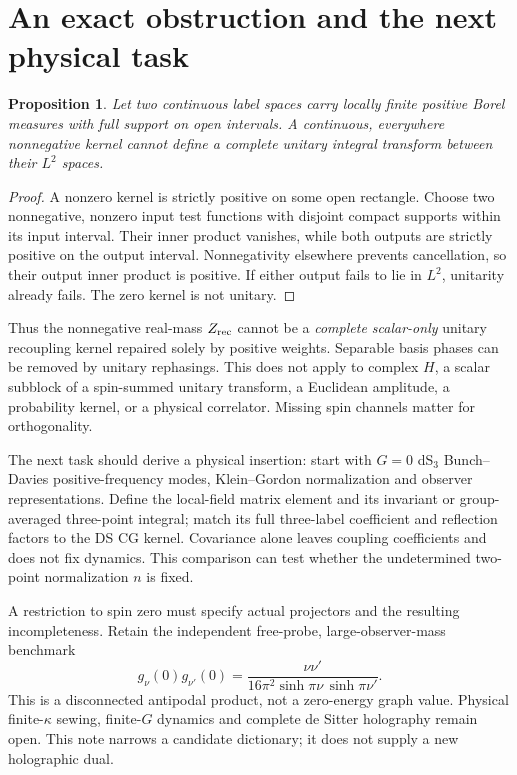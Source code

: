 \documentclass[11pt,a4paper]{article}
\newtheorem{proposition}{Proposition}
\begin{document}
\section{An exact obstruction and the next physical task}
\begin{proposition}
Let two continuous label spaces carry locally finite positive Borel
measures with full support on open intervals. A continuous,
everywhere nonnegative kernel cannot define a complete unitary
integral transform between their $L^2$ spaces.
\end{proposition}
\begin{proof}
A nonzero kernel is strictly positive on some open rectangle.
Choose two nonnegative, nonzero input test functions with disjoint
compact supports within its input interval. Their inner product
vanishes, while both outputs are strictly positive on the output
interval. Nonnegativity elsewhere prevents cancellation, so their
output inner product is positive. If either output fails to lie
in $L^2$, unitarity already fails. The zero kernel is not unitary.
\end{proof}
Thus the nonnegative real-mass $Z_{\rm rec}$ cannot be a
\emph{complete scalar-only} unitary recoupling kernel repaired
solely by positive weights. Separable basis phases can be removed
by unitary rephasings. This does not apply to complex $H$, a scalar
subblock of a spin-summed unitary transform, a Euclidean amplitude,
a probability kernel, or a physical correlator. Missing spin
channels matter for orthogonality.

The next task should derive a physical insertion: start with
$G=0$ dS$_3$ Bunch--Davies positive-frequency modes, Klein--Gordon
normalization and observer representations. Define the local-field
matrix element and its invariant or group-averaged three-point
integral; match its full three-label coefficient and reflection
factors to the DS CG kernel. Covariance alone leaves coupling
coefficients and does not fix dynamics. This comparison can test
whether the undetermined two-point normalization $n$ is fixed.

A restriction to spin zero must specify actual projectors and
the resulting incompleteness. Retain the independent free-probe,
large-observer-mass benchmark
\begin{equation}
 g_\nu(0)g_{\nu'}(0)=
 \frac{\nu\nu'}{16\pi^2\sinh\pi\nu\,\sinh\pi\nu'}.
\end{equation}
This is a disconnected antipodal product, not a zero-energy graph
value. Physical finite-$\kappa$ sewing, finite-$G$ dynamics and
complete de Sitter holography remain open. This note narrows a
candidate dictionary; it does not supply a new holographic dual.
\end{document}
